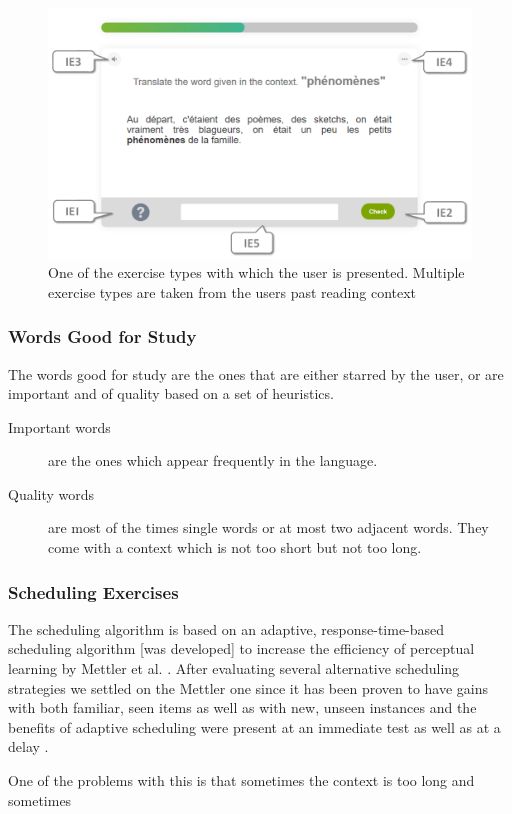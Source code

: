 \begin{figure}[h!]
\centering
  \includegraphics[width=\columnwidth]{figures/exercise_translate}
  \caption{One of the exercise types with which the user is presented. Multiple exercise types are taken from the users past reading context}
\end{figure}

\subsubsection{Words Good for Study}

The words good for study are the ones that are either starred by the user, or are important and of quality based on a set of heuristics. 

\begin{description}

  \item [Important words] are the ones which appear frequently in the language. 
  
  \item [Quality words] are most of the times single words or at most two adjacent words. They come with a context which is not too short but not too long. 

\end{description}

\subsubsection{Scheduling Exercises}

The scheduling algorithm is based on an adaptive, response-time-based scheduling algorithm [was developed] to increase the efficiency of perceptual learning by Mettler et al. \cite{Mettler14-ARTS}. After evaluating several alternative scheduling strategies we settled on the Mettler one since it has been proven to have gains with both familiar, seen items as well as with new, unseen instances and the benefits of adaptive scheduling were present at an immediate test as well as at a delay \cite{Mettler14-ARTS}.



One of the problems with this is that sometimes the context is too long and sometimes 

